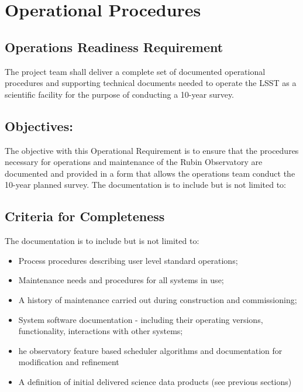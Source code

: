 \section{Operational Procedures} \label{sec:docs}

\subsection{Operations Readiness Requirement}

The project team shall deliver a complete set of documented operational procedures and supporting technical documents needed to operate the LSST as a scientific facility for the purpose of conducting a 10-year survey.

\subsection{Objectives:}

The objective with this Operational Requirement is to ensure that the procedures necessary for operations and maintenance of the Rubin Observatory are documented and provided in a form that allows the operations team conduct the 10-year planned survey. The documentation is to include but is not limited to:


\subsection{Criteria for Completeness}

The documentation is to include but is not limited to:

\begin{itemize}
	\item Process procedures describing user level standard operations;
	\item Maintenance needs and procedures for all systems in use;
	\item A history of maintenance carried out during construction and commissioning;
	\item System software documentation - including their operating versions, functionality, interactions with other systems;
	\item he observatory feature based scheduler algorithms and documentation for modification and refinement
	\item A definition of initial delivered science data products  (see previous sections)

\end{itemize}


